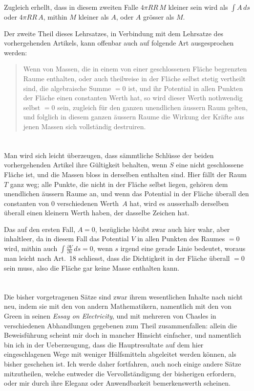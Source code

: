 \documentclass[12pt,a4paper]{article}
\begin{document}
Zugleich erhellt, dass in diesem zweiten Falle $4\pi RR\,M$ kleiner sein wird als
$\int A\,ds$ oder $4\pi RR\,A$, mithin $M$ kleiner als $A$, oder $A$ grösser als $M$.

Der zweite Theil dieses Lehrsatzes, in Verbindung mit dem Lehrsatze des
vorhergehenden Artikels, kann offenbar auch auf folgende Art ausgesprochen
werden:

\begin{quote}
Wenn von Massen, die in einem von einer geschlossenen Fläche begrenzten
Raume enthalten, oder auch theilweise in der Fläche selbst stetig vertheilt
sind, die algebraische Summe $=0$ ist, und ihr Potential in allen Punkten der
Fläche einen constanten Werth hat, so wird dieser Werth nothwendig selbst $=0$
sein, zugleich für den ganzen unendlichen äussern Raum gelten, und folglich in
diesem ganzen äussern Raume die Wirkung der Kräfte aus jenen Massen sich
vollständig destruiren.
\end{quote}

\section{}
Man wird sich leicht überzeugen, dass sämmtliche Schlüsse der beiden vorhergehenden
Artikel ihre Gültigkeit behalten, wenn $S$ eine nicht geschlossene
Fläche ist, und die Massen bloss in derselben enthalten sind. Hier fällt der Raum
$T$ ganz weg; alle Punkte, die nicht in der Fläche selbst liegen, gehören dem
unendlichen äussern Raume an, und wenn das Potential in der Fläche überall
den constanten von $0$ verschiedenen Werth~$A$ hat, wird es ausserhalb derselben
überall einen kleinern Werth haben, der dasselbe Zeichen hat.

Das auf den ersten Fall, $A=0$, bezügliche bleibt zwar auch hier wahr,
aber inhaltleer, da in diesem Fall das Potential $V$ in allen Punkten des Raumes
$=0$ wird, mithin auch $\int\frac{\partial V}{\partial s}\,ds=0$, wenn $s$ irgend eine gerade Linie bedeutet, woraus man leicht nach Art.~18 schliesst, dass die Dichtigkeit in der Fläche überall $=0$ sein muss, also die Fläche gar keine Masse enthalten kann.

\section{}
Die bisher vorgetragenen Sätze sind zwar ihrem wesentlichen Inhalte nach
nicht neu, indem sie mit den von andern Mathematikern, namentlich mit den von
Green in seinen \emph{Essay on Electricity}, und mit mehreren von Chasles in verschiedenen
Abhandlungen gegebenen zum Theil zusammenfallen: allein die Beweisführung
scheint mir doch in mancher Hinsicht einfacher, und namentlich bin ich
in der Ueberzeugung, dass die Hauptresultate auf dem hier eingeschlagenen
Wege mit weniger Hülfsmitteln abgeleitet werden können, als bisher geschehen
ist. Ich werde daher fortfahren, auch noch einige andere Sätze mitzutheilen,
welche entweder die Vervollständigung der bisherigen erfordern, oder mir durch
ihre Eleganz oder Anwendbarkeit bemerkenswerth scheinen.
\end{document}
